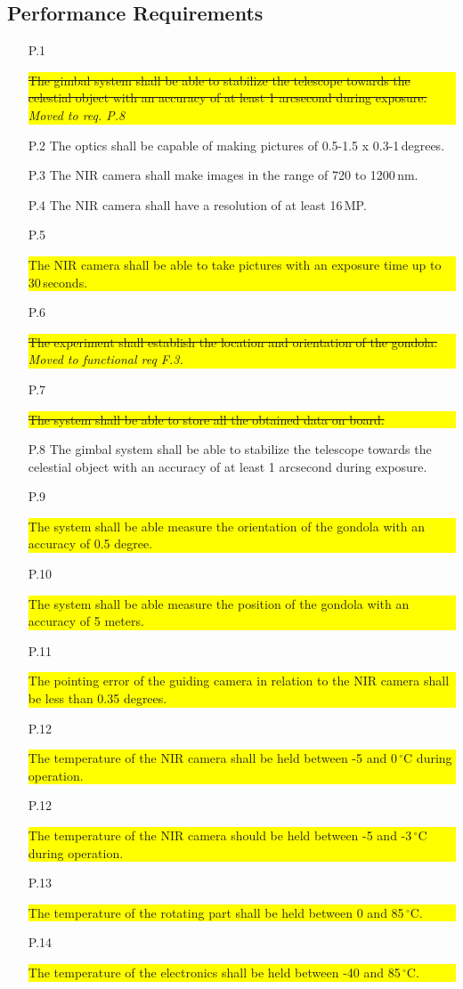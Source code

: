 \subsection{Performance Requirements}

\begin{enumerate}[topsep=0pt,itemsep=-1ex,partopsep=1ex,parsep=1ex]
    \item[P.1] \colorbox{yellow}{\parbox{\textwidth}{\st{The gimbal system shall be able to stabilize the telescope towards the celestial object with an accuracy of at least 1 arcsecond during exposure.} \textit{Moved to req. P.8}}}
    \item[P.2] The optics shall be capable of making pictures of 0.5-1.5 x 0.3-1\,degrees.
    \item[P.3] The NIR camera shall make images in the range of 720 to 1200\,nm.
    \item[P.4] The NIR camera shall have a resolution of at least 16\,MP.
    \item[P.5] \colorbox{yellow}{\parbox{\textwidth}{The NIR camera shall be able to take pictures with an exposure time up to 30\,seconds.}}
    \item[P.6] \colorbox{yellow}{\parbox{\textwidth}{\st{The experiment shall establish the location and orientation of the gondola.} \textit{Moved to functional req F.3.}}}
    \item[P.7] \colorbox{yellow}{\parbox{\textwidth}{\st{The system shall be able to store all the obtained data on board.}}}
    \item[P.8] The gimbal system shall be able to stabilize the telescope towards the celestial object with an accuracy of at least 1 arcsecond during exposure.
    \item[P.9] \colorbox{yellow}{\parbox{\textwidth}{The system shall be able measure the orientation of the gondola with an accuracy of 0.5 degree.}}
	\item[P.10] \colorbox{yellow}{\parbox{\textwidth}{The system shall be able measure the position of the gondola with an accuracy of 5 meters.}}
	\item[P.11] \colorbox{yellow}{\parbox{\textwidth}{The pointing error of the guiding camera in relation to the NIR camera shall be less than 0.35 degrees.}}
	\item[P.12] \colorbox{yellow}{\parbox{\textwidth}{The temperature of the NIR camera shall be held between -5 and 0\,$^\circ$C during operation.}}
	\item[P.12] \colorbox{yellow}{\parbox{\textwidth}{The temperature of the NIR camera should be held between -5 and -3\,$^\circ$C during operation.}}
	\item[P.13] \colorbox{yellow}{\parbox{\textwidth}{The temperature of the rotating part shall be held between 0 and 85\,$^\circ$C.}}
	\item[P.14] \colorbox{yellow}{\parbox{\textwidth}{The temperature of the electronics shall be held between -40 and 85\,$^\circ$C.}}
\end{enumerate}
